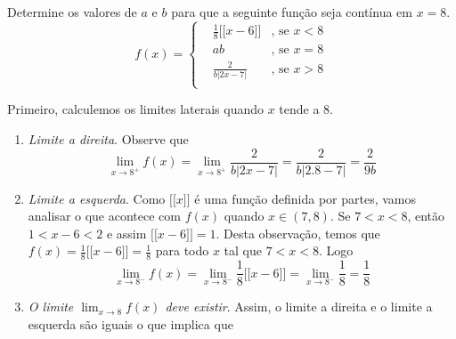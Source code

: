 \documentclass[11pt]{exam}
\begin{document}
\begin{questions}
  \question[20] Determine os valores de $a$  e $b$ para que a seguinte função seja contínua
  em $x=8$.            
    $$
    f(x)= \left\{  
            \begin{array}{lll}
    &\frac{1}{8} \lbrack\!\lbrack x-6 \rbrack\!\rbrack  
    &\text{, se } x < 8 \\
    &ab    &\text{, se } x=8\\
    &\frac{2}{b|2x-7|}    &\text{, se } x>8\\
            \end{array}
            \right. 
    $$
      \begin{solution}
      Primeiro, calculemos os limites laterais quando $x$ tende a $8$.
        \begin{enumerate}
        \item {\it Limite a direita}. Observe que  
        $$ 
        \lim_{x \rightarrow 8^{+}} f(x)=
        \lim_{x \rightarrow 8^{+}}\frac{2}{b|2x-7|} =\frac{2}{b|2.8-7|}
       =\frac{2}{9b} $$
        \item {\it Limite a esquerda}. Como 
        $\lbrack\!\lbrack x \rbrack\!\rbrack$ é uma função definida por partes, vamos analisar o que acontece com $f(x)$ quando $x \in (7, 8)$.
        Se $7<x<8$, então $1<x-6<2$ e assim $\lbrack\!\lbrack x-6 \rbrack\!\rbrack=1$. Desta observação, temos que $f(x)=\frac{1}{8}\lbrack\!\lbrack x-6 \rbrack\!\rbrack=\frac{1}{8}$ para todo $x$ tal que  $7<x<8$. 
        Logo
          $$ 
        \lim_{x \rightarrow 8^{-}} f(x)=
        \lim_{x \rightarrow 8^{-}} \frac{1}{8}\lbrack\!\lbrack x-6 \rbrack\!\rbrack=
        \lim_{x \rightarrow 8^{-}} \frac{1}{8}=\frac{1}{8} $$
        \item {\it O limite $\lim_{x \rightarrow 8} f(x)$ deve existir}.  Assim, o limite a direita e o limite a esquerda são iguais o que implica que 

\end{enumerate}
\end{solution}
\end{questions}
\end{document}

